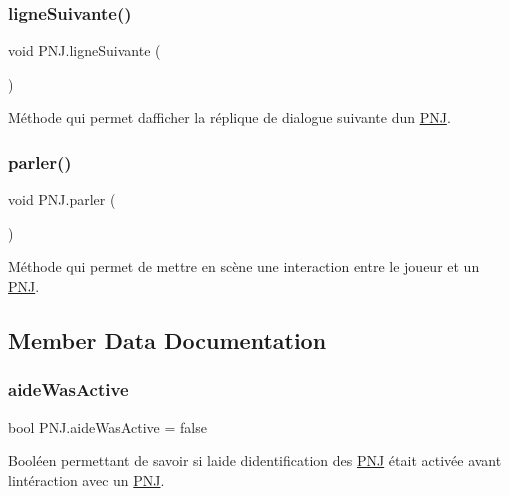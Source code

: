 \subsubsection{\texorpdfstring{ligne\+Suivante()}{ligneSuivante()}}
{\footnotesize\ttfamily void P\+N\+J.\+ligne\+Suivante (\begin{DoxyParamCaption}{ }\end{DoxyParamCaption})\hspace{0.3cm}{\ttfamily [inline]}}

Méthode qui permet d\textquotesingle{}afficher la réplique de dialogue suivante d\textquotesingle{}un \mbox{\hyperlink{class_p_n_j}{P\+NJ}}. \mbox{\label{class_p_n_j_a388238d430ad9e0c0c3d0bbe4255759d}} 
\subsubsection{\texorpdfstring{parler()}{parler()}}
{\footnotesize\ttfamily void P\+N\+J.\+parler (\begin{DoxyParamCaption}{ }\end{DoxyParamCaption})\hspace{0.3cm}{\ttfamily [inline]}}

Méthode qui permet de mettre en scène une interaction entre le joueur et un \mbox{\hyperlink{class_p_n_j}{P\+NJ}}. 

\subsection{Member Data Documentation}
\mbox{\label{class_p_n_j_ab86390338799614c76821168e15e82fa}} 
\subsubsection{\texorpdfstring{aide\+Was\+Active}{aideWasActive}}
{\footnotesize\ttfamily bool P\+N\+J.\+aide\+Was\+Active = false\hspace{0.3cm}{\ttfamily [private]}}

Booléen permettant de savoir si l\textquotesingle{}aide d\textquotesingle{}identification des \mbox{\hyperlink{class_p_n_j}{P\+NJ}} était activée avant l\textquotesingle{}intéraction avec un \mbox{\hyperlink{class_p_n_j}{P\+NJ}}. \mbox{\label{class_p_n_j_a65a209525dc2d601bfeeaab76b770d51}} 
